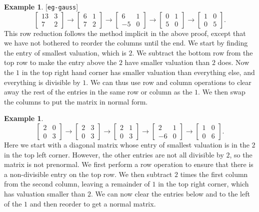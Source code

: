 \documentclass{amsart}
\newcommand{\lbl}[1]{\label{#1}\textup{[\texttt{#1}]}\ \\}
\newcommand{\lbl}{\label}
\newcommand{\bbm}       {\left[\begin{matrix}}
\newcommand{\ebm}       {\end{matrix}\right]}
\newcommand{\xra}       {\xrightarrow}
\renewcommand{\:}{\colon}
\theoremstyle{definition}
\newtheorem{example}[theorem]{Example}
\begin{document}
\begin{example}\lbl{eg-gauss}
 \[ \bbm 13&3\\7&2 \ebm \xra{}
    \bbm 6&1\\7&2 \ebm \xra{}
    \bbm 6&1\\-5&0 \ebm \xra{}
    \bbm 0&1\\5&0 \ebm \xra{}
    \bbm 1&0\\0&5 \ebm.
 \]
 This row reduction follows the method implicit in the above proof,
 except that we have not bothered to reorder the columns until the
 end.  We start by finding the entry of smallest valuation, which is
 $2$.  We subtract the bottom row from the top row to make the entry
 above the $2$ have smaller valuation than $2$ does.  Now the $1$ in
 the top right hand corner has smaller valuation than everything else,
 and everything is divisible by $1$.  We can thus use row and column
 operations to clear away the rest of the entries in the same row or
 column as the $1$.  We then swap the columns to put the matrix in
 normal form.
\end{example}
\begin{example}
 \[ \bbm 2&0\\ 0&3 \ebm  \xra{}
    \bbm 2&3\\ 0&3 \ebm  \xra{}
    \bbm 2&1\\ 0&3 \ebm  \xra{}
    \bbm 2&1\\-6&0 \ebm  \xra{}
    \bbm 1&0\\ 0&6 \ebm.
 \]
 Here we start with a diagonal matrix whose entry of smallest
 valuation is in the $2$ in the top left corner.  However, the other
 entries are not all divisible by $2$, so the matrix is not
 prenormal.  We first perform a row operation to ensure that there is
 a non-divisible entry on the top row.  We then subtract $2$ times the
 first column from the second column, leaving a remainder of $1$ in
 the top right corner, which has valuation smaller than $2$.  We can
 now clear the entries below and to the left of the $1$ and then
 reorder to get a normal matrix.
\end{example}
\end{document}
